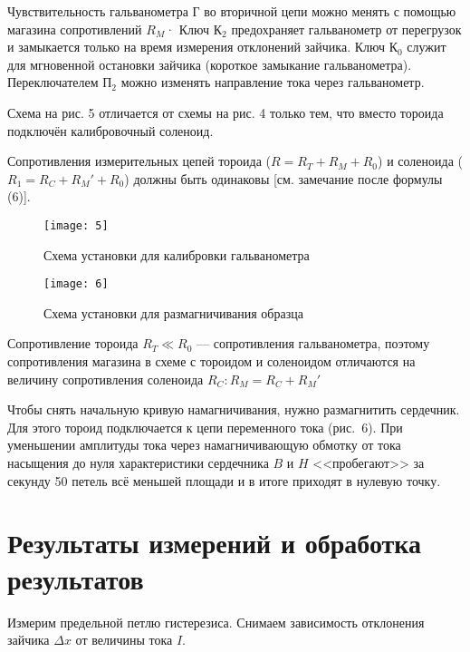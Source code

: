 Чувствительность гальванометра Г во
вторичной цепи можно менять с помощью
магазина сопротивлений $R_M$· Ключ
$\text{К}_2$
предохраняет
гальванометр от перегрузок и замыкается
только на время измерения отклонений
зайчика. Ключ $\text{К}_0$ служит для мгновенной
остановки зайчика (короткое замыкание
гальванометра). Переключателем
$\text{П}_2$ можно
изменять направление тока через
гальванометр.

Схема на рис. 5 отличается от схемы на
рис. 4 только тем, что вместо тороида
подключён калибровочный соленоид.

Сопротивления измерительных цепей
тороида ($R = R_T + R_M + R_0$) и соленоида
($R_1 = R_C + R_M' + R_0$) должны быть
одинаковы [см. замечание после формулы
(6)].
\begin{figure}[H]
    \texttt{[image: 5]} 
    \captionsetup{justification=centering}
    \caption{ Схема установки для
    калибровки гальванометра }
\end{figure}

\begin{wrapfigure}[8]{r}{0.35\linewidth}
    \vspace{-2ex}
    \texttt{[image: 6]}
    \captionsetup{justification=centering}
    \caption{Схема установки для
    размагничивания образца}
\end{wrapfigure}

Сопротивление тороида $R_T \ll R_0$ —
сопротивления гальванометра, поэтому
сопротивления магазина в схеме с
тороидом и соленоидом отличаются на
величину сопротивления соленоида $R_C:
R_M = R_C + R_M'$

Чтобы снять начальную кривую
намагничивания, нужно размагнитить
сердечник. Для этого тороид подключается
к цепи переменного тока (рис.~6). При
уменьшении амплитуды тока через
намагничивающую обмотку от тока
насыщения до нуля характеристики
сердечника $B$ и $H$ <<пробегают>>
за секунду 50 петель всё меньшей площади
и в итоге приходят в нулевую точку.



\section{Результаты измерений и обработка результатов}

Измерим предельной петлю гистерезиса.
Снимаем зависимость отклонения зайчика
$\Delta x$
от величины тока $I$.

